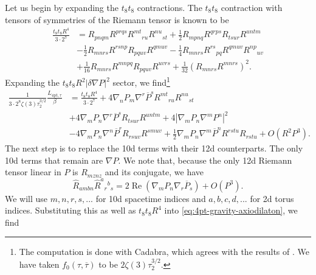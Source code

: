 Let us begin by expanding the $t_8t_8$ contractions.
The $t_8t_8$ contraction with tensors of symmetries of the Riemann tensor is known \cite{Policastro:2008hg} to be 
\begin{equation}
\begin{aligned}
\frac{t_8t_8 R^4}{3 \cdot 2^7}
&=  R_{pnqm} R^{prqs} R^{mt}{}_{ru} R^{nu}{}_{st} + \frac{1}{2}R_{mpnq} R^{qrps} R_{tsur} R^{untm} \\
& - \frac{1}{2}R_{mnrs} R^{rsnp} R_{pquv} R^{qmuv} - \frac{1}{4} R_{mnrs} R^{rs}{}_{pq} R^{qmuv} R^{np}{}_{uv}\\
& + \frac{1}{16} R_{mnrs} R^{mnpq} R_{pquv} R^{uvrs} + \frac{1}{32}(R_{mnrs} R^{mnrs})^2.
\end{aligned}
\label{eq:t8t8R4}
\end{equation}
Expanding the $t_8 t_8 R^2 |\delta \nabla P|^2$ sector, we find\footnote{
The computation is done with Cadabra, which agrees with the results of \cite{Minasian:2015bxa}. We have taken $f_0(\tau,\overline{\tau})$ to be $2\zeta(3) \tau_2^{3/2}$.
}
\begin{equation}
\begin{aligned}
\frac{1}{3 \cdot 2^{8}\zeta(3) \tau_2^{3/2}}\frac{L_{\text{4pt},\tau}}{\beta}
&=  \frac{t_8 t_8 R^4}{3 \cdot 2^7}
+ 4 \nabla_n P_m \nabla^r \overline{P}^s R^{mt}{}_{ru} R^{nu}{}_{st} \\
&+ 4 \nabla_m P_n \nabla^r \overline{P}^s R_{tsur} R^{untm}
+ 4 |\nabla_m P_n \nabla^m P^n|^2 \\
&- 4 \nabla_m P_n \nabla^n \overline{P}^r R_{rsuv} R^{smuv}
+ \frac{1}{2} \nabla_{m} P_{n} \nabla^{m}\overline{P}^{n}R^{rstu}R_{rstu} + O(R^2 P^3).
\end{aligned}
\end{equation}
The next step is to replace the 10d terms with their 12d counterparts. The only 10d terms that remain are $\nabla P$.
We note that, because the only 12d Riemann tensor linear in $P$ is $R_{mznz}$ and its conjugate, we have
\begin{equation}
\widehat{R}_{ambn} \widehat{R}^{a}{}_{r}{}^{b}{}_{s} = 2 \operatorname{Re}\left(\nabla_m P_n \nabla_r \overline{P}_s\right) + O(P^3).
\end{equation}
We will use $m, n, r, s, ...$ for 10d spacetime indices and $a, b, c, d, ...$ for 2d torus indices.
Substituting this as well as $t_8 t_8 R^4$ into \eqref{eq:4pt-gravity-axiodilaton}, we find
